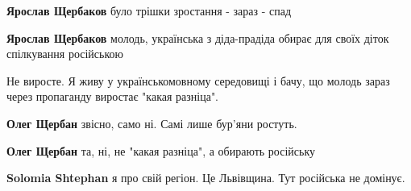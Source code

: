\begin{itemize}
\begin{itemize}
\textbf{Ярослав Щербаков} було трішки зростання - зараз - спад

 
\textbf{Ярослав Щербаков} молодь, українська з діда-прадіда обирає для своїх діток спілкування російською
\end{itemize}

 

Не виросте. Я живу у українськомовному середовищі і бачу, що молодь зараз через
пропаганду виростає "какая разніца".

\begin{itemize}
 
\textbf{Олег Щербан} звісно, само ні. Самі лише бур'яни ростуть.

 
\textbf{Олег Щербан} та, ні, не "какая разніца", а обирають російську

 
\textbf{Solomia Shtephan} я про свій регіон. Це Львівщина. Тут російська не домінує.

 

\end{itemize}
\end{itemize}
